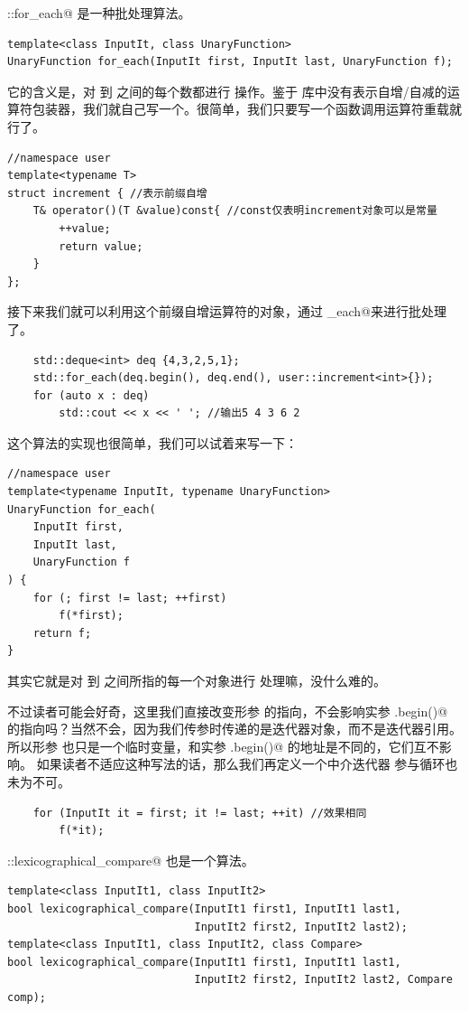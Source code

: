 \lstinline@std::for_each@ 是一种批处理算法。
\begin{lstlisting}
template<class InputIt, class UnaryFunction>
UnaryFunction for_each(InputIt first, InputIt last, UnaryFunction f);
\end{lstlisting}
它的含义是，对 \lstinline@first@ 到 \lstinline@last@ 之间的每个数都进行 \lstinline@f@ 操作。鉴于 \lstinline@functional@ 库中没有表示自增/自减的运算符包装器，我们就自己写一个。很简单，我们只要写一个函数调用运算符重载就行了。
\begin{lstlisting}
//namespace user
template<typename T>
struct increment { //表示前缀自增
    T& operator()(T &value)const{ //const仅表明increment对象可以是常量
        ++value;
        return value;
    }
};
\end{lstlisting}
接下来我们就可以利用这个前缀自增运算符的对象，通过 \lstinline@for_each@来进行批处理了。
\begin{lstlisting}
    std::deque<int> deq {4,3,2,5,1};
    std::for_each(deq.begin(), deq.end(), user::increment<int>{});
    for (auto x : deq)
        std::cout << x << ' '; //输出5 4 3 6 2
\end{lstlisting}\par
这个算法的实现也很简单，我们可以试着来写一下：
\begin{lstlisting}
//namespace user
template<typename InputIt, typename UnaryFunction>
UnaryFunction for_each(
    InputIt first,
    InputIt last,
    UnaryFunction f
) {
    for (; first != last; ++first)
        f(*first);
    return f;
}
\end{lstlisting}
其实它就是对 \lstinline@first@ 到 \lstinline@last@ 之间所指的每一个对象进行 \lstinline@f@ 处理嘛，没什么难的。\par
不过读者可能会好奇，这里我们直接改变形参 \lstinline@first@ 的指向，不会影响实参 \lstinline@deq.begin()@ 的指向吗？当然不会，因为我们传参时传递的是迭代器对象，而不是迭代器引用。所以形参 \lstinline@first@ 也只是一个临时变量，和实参 \lstinline@deq.begin()@ 的地址是不同的，它们互不影响。
如果读者不适应这种写法的话，那么我们再定义一个中介迭代器 \lstinline@it@ 参与循环也未为不可。
\begin{lstlisting}
    for (InputIt it = first; it != last; ++it) //效果相同
        f(*it);
\end{lstlisting}\par
\lstinline@std::lexicographical_compare@ 也是一个算法。
\begin{lstlisting}
template<class InputIt1, class InputIt2>
bool lexicographical_compare(InputIt1 first1, InputIt1 last1,
                             InputIt2 first2, InputIt2 last2);
template<class InputIt1, class InputIt2, class Compare>
bool lexicographical_compare(InputIt1 first1, InputIt1 last1,
                             InputIt2 first2, InputIt2 last2, Compare comp);
\end{lstlisting}
